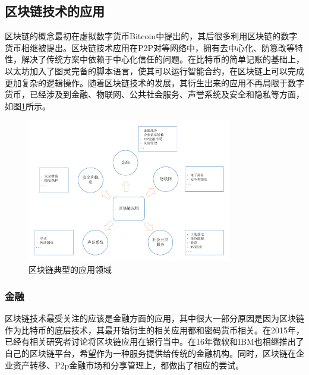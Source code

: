 \subsection{区块链技术的应用}

区块链的概念最初在虚拟数字货币Bitcoin中提出的\cite{nakamoto2008bitcoin}，其后很多利用区块链的数字货币相继被提出。区块链技术应用在P2P对等网络中，拥有去中心化、防篡改等特性，解决了传统方案中依赖于中心化信任的问题。在比特币的简单记账的基础上，以太坊\cite{buterin2013ethereum}加入了图灵完备的脚本语言，使其可以运行智能合约，在区块链上可以完成更加复杂的逻辑操作。随着区块链技术的发展，其衍生出来的应用不再局限于数字货币，已经涉及到金融、物联网、公共社会服务、声誉系统及安全和隐私等方面\cite{zheng2016blockchain}，如图\ref{fig:applications}所示。

\begin{figure}[htbp]
 	\centering
 	\includegraphics[width = 0.8\textwidth]{img/applications}
 	\caption{区块链典型的应用领域}\label{fig:applications}
\end{figure}


\subsubsection{金融}

区块链技术最受关注的应该是金融方面的应用，其中很大一部分原因是因为区块链作为比特币的底层技术，其最开始衍生的相关应用都和密码货币相关。在2015年，已经有相关研究者讨论将区块链应用在银行当中\cite{peters2015trends}。在16年微软和IBM也相继推出了自己的区块链平台，希望作为一种服务提供给传统的金融机构。同时，区块链在企业资产转移、P2p金融市场和分享管理上，都做出了相应的尝试。

